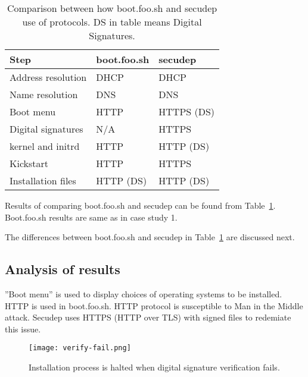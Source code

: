 \begin{table}[!ht]
  \def\arraystretch{1.1}%
  \begin{center}
    \begin{tabular}{| l | l | l |}
      \hline
      Step               & boot.foo.sh   & secudep    \\
      \hline
      Address resolution & DHCP          & DHCP       \\
      Name resolution    & DNS           & DNS        \\
      Boot menu          & HTTP          & HTTPS (DS) \\
      Digital signatures & N/A           & HTTPS      \\
      kernel and initrd  & HTTP          & HTTP (DS)  \\
      Kickstart          & HTTP          & HTTPS      \\
      Installation files & HTTP (DS)     & HTTP (DS)  \\
      \hline
    \end{tabular}
    \caption{Comparison between how boot.foo.sh and secudep use of
      protocols. DS in table means Digital
      Signatures.\label{tab:comparison_table}}
  \end{center}
\end{table}

Results of comparing boot.foo.sh and secudep can be found from
Table~\ref{tab:comparison_table}. Boot.foo.sh results are same as in
case study 1.

The differences between boot.foo.sh and secudep in
Table~\ref{tab:comparison_table} are discussed next.


\subsection{Analysis of results}

''Boot menu'' is used to display choices of operating systems to be
installed. HTTP is used in boot.foo.sh. HTTP protocol is susceptible
to Man in the Middle attack. Secudep uses HTTPS (HTTP over TLS) with
signed files to redemiate this issue.

\begin{figure}[h]
  \texttt{[image: verify-fail.png]}
  \caption{Installation process is halted when digital signature
    verification fails.\label{fig:verify-fail}}
\end{figure}

